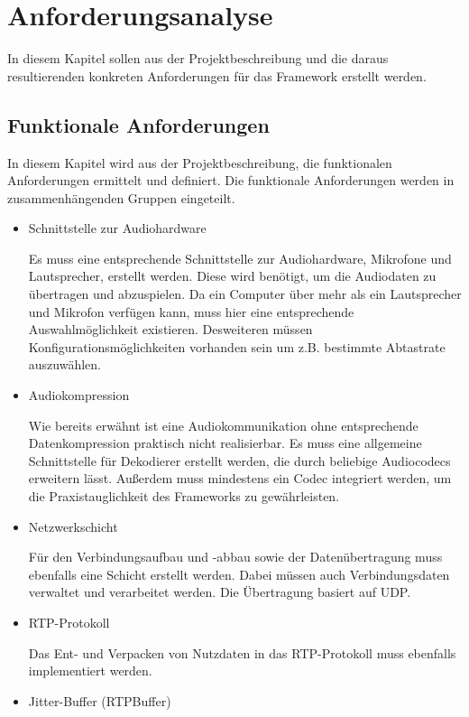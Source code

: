 \chapter{Anforderungsanalyse}
In diesem Kapitel sollen aus der Projektbeschreibung und die daraus resultierenden konkreten Anforderungen für das Framework erstellt werden. 

\section{Funktionale Anforderungen}
	In diesem Kapitel wird aus der Projektbeschreibung, die funktionalen Anforderungen ermittelt und definiert. Die funktionale Anforderungen werden in zusammenhängenden Gruppen eingeteilt.

	\begin{itemize} 
		\item Schnittstelle zur Audiohardware

		Es muss eine entsprechende Schnittstelle zur Audiohardware, Mikrofone und Lautsprecher, erstellt werden. Diese wird benötigt, um die Audiodaten zu übertragen und abzuspielen. Da ein Computer über mehr als ein Lautsprecher und Mikrofon verfügen kann, muss hier eine entsprechende Auswahlmöglichkeit existieren. Desweiteren müssen Konfigurationsmöglichkeiten vorhanden sein um z.B. bestimmte Abtastrate auszuwählen.
			
		\item Audiokompression

		Wie bereits erwähnt ist eine Audiokommunikation ohne entsprechende Datenkompression praktisch nicht realisierbar. Es muss eine allgemeine Schnittstelle für Dekodierer erstellt werden, die durch beliebige Audiocodecs erweitern lässt. Außerdem muss mindestens ein Codec integriert werden, um die Praxistauglichkeit des Frameworks zu gewährleisten.
			
		\item Netzwerkschicht

		Für den Verbindungsaufbau und -abbau sowie der Datenübertragung muss ebenfalls eine Schicht erstellt werden. Dabei müssen auch Verbindungsdaten verwaltet und verarbeitet werden. Die Übertragung basiert auf UDP.
				
		\item RTP-Protokoll

		Das Ent- und Verpacken von Nutzdaten in das RTP-Protokoll muss ebenfalls implementiert werden.
				
		\item Jitter-Buffer (RTPBuffer)


\end{itemize}
